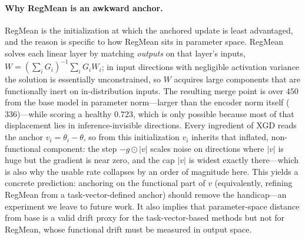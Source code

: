 \documentclass{article} %
\begin{document}
\paragraph{Why RegMean is an awkward anchor.}
RegMean is the initialization at which the anchored update is least advantaged, and the reason is specific to how RegMean sits in parameter space. RegMean solves each linear layer by matching \emph{outputs} on that layer's inputs, $W=(\sum_i G_i)^{-1}\sum_i G_i W_i$; in input directions with negligible activation variance the solution is essentially unconstrained, so $W$ acquires large components that are functionally inert on in-distribution inputs. The resulting merge point is over $450$ from the base model in parameter norm---larger than the encoder norm itself ($336$)---while scoring a healthy $0.723$, which is only possible because most of that displacement lies in inference-invisible directions. Every ingredient of XGD reads the anchor $v_i=\theta_i-\theta$, so from this initialization $v_i$ inherits that inflated, non-functional component: the step $-g\odot|v|$ scales noise on directions where $|v|$ is huge but the gradient is near zero, and the cap $|v|$ is widest exactly there---which is also why the usable rate collapses by an order of magnitude here. This yields a concrete prediction: anchoring on the functional part of $v$ (equivalently, refining RegMean from a task-vector-defined anchor) should remove the handicap---an experiment we leave to future work. It also implies that parameter-space distance from base is a valid drift proxy for the task-vector-based methods but not for RegMean, whose functional drift must be measured in output space.

\end{document}
